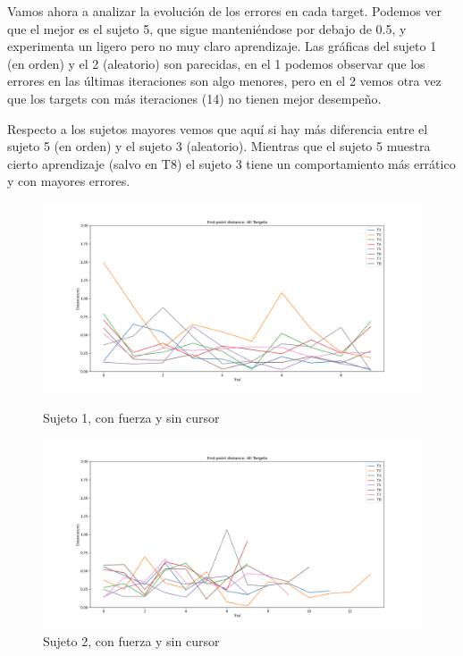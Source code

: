 \documentclass[a4paper,11pt, oneside]{book}
\begin{document}
Vamos ahora a analizar la evolución de los errores en cada target. Podemos ver que el mejor es el sujeto 5, que sigue manteniéndose por debajo de 0.5, y experimenta un ligero pero no muy claro aprendizaje. Las gráficas del sujeto 1 (en orden) y el 2 (aleatorio) son parecidas, en el 1 podemos observar que los errores en las últimas iteraciones son algo menores, pero en el 2 vemos otra vez que los targets con más iteraciones (14) no tienen mejor desempeño. 

Respecto a los sujetos mayores vemos que aquí si hay más diferencia entre el sujeto 5 (en orden) y el sujeto 3 (aleatorio). Mientras que el sujeto 5 muestra cierto aprendizaje (salvo en T8) el sujeto 3 tiene un comportamiento más errático y con mayores errores.

\begin{figure}[H]
	\begin{minipage}[b]{0.5\linewidth}
		\centering
		\includegraphics[width=\linewidth]{sujeto1/force_no_cursor/evolution_distance}
		\caption{Sujeto 1, con fuerza y sin cursor}
		\label{fig:figura1}
	\end{minipage}
	\hspace{0.5cm}
	\begin{minipage}[b]{0.5\linewidth}
		\centering
		\includegraphics[width=\linewidth]{sujeto2/force_no_cursor/evolution_distance}
		\caption{Sujeto 2, con fuerza y sin cursor}
		\label{fig:figura2}
	\end{minipage}
\end{figure}
\end{document}
